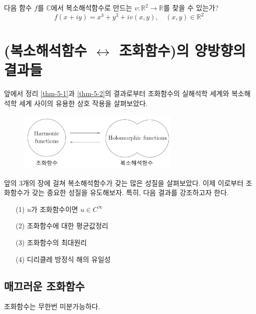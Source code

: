 \begin{salt_exercise}\label{ex-5-6}
다음 함수 $f$를 $\mathbb C$에서 복소해석함수로 만드는 $v:\mathbb R^2 \to \mathbb R$를
찾을 수 있는가? 
\[
f (x+iy)= x^3+y^3 + iv(x,y),\quad (x,y)\in \mathbb R^2
\]
\end{salt_exercise}

\section{(복소해석함수 $\leftrightarrow$ 조화함수)의 양방향의 결과들}

앞에서 정리 \ref{thm-5-1}과 \ref{thm-5-2}의 결과로부터 조화함수의 실해석학 세계와
복소해석학 세계 사이의 유용한 상호 작용을 살펴보았다.

\begin{figure}[h!]
\begin{center}
\includegraphics[width=0.7\textwidth]{./SaltChapter/figs/fig-5-0-1-kr}
\end{center}
\end{figure}

앞의 3개의 장에 걸쳐 복소해석함수가 갖는 많은 성질을 살펴보았다.
이제 이로부터 조화함수가 갖는 중요한 성질을 유도해보자.
특히, 다음 결과를 강조하고자 한다.
\begin{itemize}
\item[(1)] $u$가 조화함수이면 $u\in C^\infty$
\item[(2)] 조화함수에 대한 평균값정리
\item[(3)] 조화함수의 최대원리
\item[(4)] 디리클레 방정식 해의 유일성
\end{itemize}

\subsection{매끄러운 조화함수}

\begin{salt_corollary}\label{coro-5-1}
조화함수는 무한번 미분가능하다.
\end{salt_corollary}

